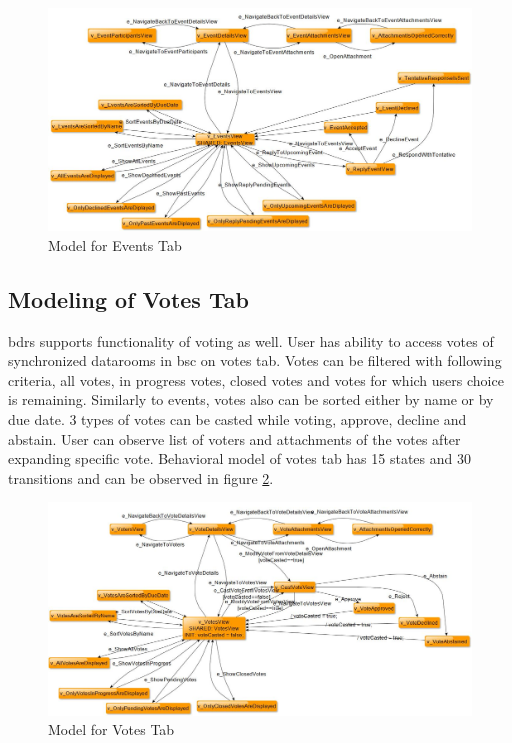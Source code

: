 \begin{figure} [htbp!]
	\centering
					\includegraphics[width=1\textwidth]{figures/Events_model_screenshot}
					\caption{\label{Fig:Events_Model_Screenshot} Model for Events Tab}
\end{figure}

\subsection{Modeling of Votes Tab}
\par
\acrshort{bdrs} supports functionality of voting as well. User has ability to access votes of synchronized datarooms in \acrshort{bsc} on votes tab. Votes can be filtered with following criteria, all votes, in progress votes, closed votes and votes for which users choice is remaining. Similarly to events, votes also can be sorted either by name or by due date. 3 types of votes can be casted while voting, approve, decline and abstain. User can observe list of voters and attachments of the votes after expanding specific vote. Behavioral model of votes tab has 15 states and 30 transitions and can be observed in figure \ref{Fig:Votes_Model_Screenshot}.

\begin{figure} [htbp!]
	\centering
					\includegraphics[width=1\textwidth]{figures/Votes_model_screenshot}
					\caption{\label{Fig:Votes_Model_Screenshot} Model for Votes Tab}
\end{figure}


